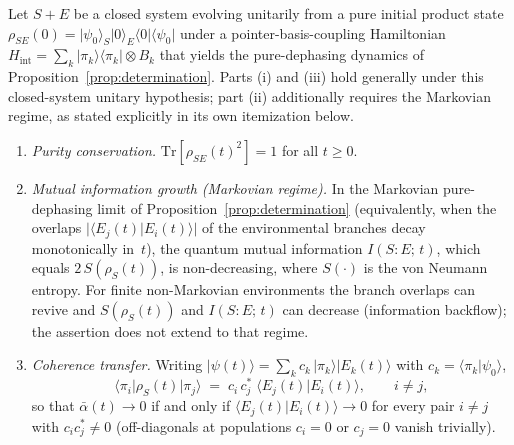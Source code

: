 \begin{proposition}
\label{prop:conservation}
Let $S{+}E$ be a closed system evolving unitarily from a pure initial
product state $\rho_{SE}(0)
  = \vert\psi_0\rangle_S\vert 0\rangle_E\langle 0\vert\langle\psi_0\vert$
under a pointer-basis-coupling Hamiltonian
$H_{\mathrm{int}} = \sum_k\vert\pi_k\rangle\langle\pi_k\vert\otimes B_k$
that yields the pure-dephasing dynamics of
Proposition~\ref{prop:determination}.
Parts (i) and (iii) hold generally under this closed-system unitary
hypothesis; part (ii) additionally requires the Markovian regime, as
stated explicitly in its own itemization below.
\begin{enumerate}
  \item[\emph{(i)}] \emph{Purity conservation.}
    $\mathrm{Tr}[\rho_{SE}(t)^2] = 1$ for all $t \geq 0$.
  \item[\emph{(ii)}] \emph{Mutual information growth (Markovian regime).}
    In the Markovian pure-dephasing limit of
    Proposition~\ref{prop:determination} (equivalently, when the overlaps
    $\lvert\langle E_j(t)\vert E_i(t)\rangle\rvert$ of the environmental
    branches decay monotonically in~$t$), the quantum mutual information
    $I(S\!:\!E;\,t)$, which equals $2\,S(\rho_S(t))$, is non-decreasing, where
    $S(\cdot)$ is the von Neumann entropy.
    For finite non-Markovian environments the branch overlaps can revive
    and $S(\rho_S(t))$ and $I(S\!:\!E;\,t)$ can decrease (information
    backflow); the assertion does not extend to that regime.
  \item[\emph{(iii)}] \emph{Coherence transfer.}
    Writing $\vert\psi(t)\rangle = \sum_k c_k\,
    \vert\pi_k\rangle\vert E_k(t)\rangle$ with
    $c_k = \langle\pi_k\vert\psi_0\rangle$,
    \begin{equation}
    \label{eq:coherence-transfer}
      \langle\pi_i\vert\rho_S(t)\vert\pi_j\rangle
      \;=\; c_i\,c_j^*\;\langle E_j(t)\vert E_i(t)\rangle,
      \qquad i \neq j,
    \end{equation}
    so that $\bar{\alpha}(t) \to 0$ if and only if
    $\langle E_j(t)\vert E_i(t)\rangle \to 0$ for every pair $i \neq j$
    with $c_i c_j^* \neq 0$ (off-diagonals at populations $c_i = 0$
    or $c_j = 0$ vanish trivially).
\end{enumerate}
\end{proposition}

